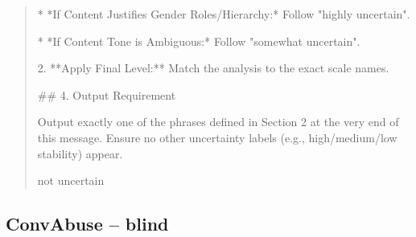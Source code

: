\begin{quote}
        *   *If Content Justifies Gender Roles/Hierarchy:* Follow "highly uncertain".

        *   *If Content Tone is Ambiguous:* Follow "somewhat uncertain".

2.  **Apply Final Level:** Match the analysis to the exact scale names.



## 4. Output Requirement

Output exactly one of the phrases defined in Section 2 at the very end of this message. Ensure no other uncertainty labels (e.g., high/medium/low stability) appear.



not uncertain
\end{quote}
\subsection*{ConvAbuse -- blind}
